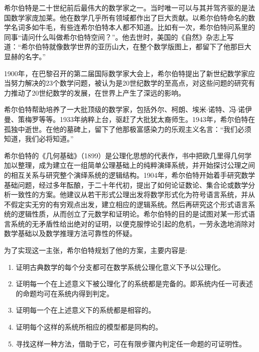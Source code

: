 \documentclass[b5paper]{ctexart}
\begin{document}
希尔伯特是二十世纪前后最伟大的数学家之一。当时唯一可以与其并驾齐驱的是法国数学家庞加莱。他在数学几乎所有领域都作出了巨大贡献。以希尔伯特命名的数学名词多如牛毛，有些连希尔伯特本人都不知道。比如有一次，希尔伯特问系里的同事“请问什么叫做希尔伯特空间？”。他去世时，美国的《自然》杂志上写道：“希尔伯特就像数学世界的亚历山大，在整个数学版图上，都留下了他那巨大显赫的名字。”\cite{HanXueTao16}

1900年，在巴黎召开的第二届国际数学家大会上，希尔伯特提出了新世纪数学家应当努力解决的23个数学问题，被认为是20世纪数学的至高点，对这些问题的研究有力推动了20世纪数学的发展，在世界上产生了深远的影响。

希尔伯特帮助培养了一大批顶级的数学家，包括外尔、柯朗、埃米$\cdot$诺特、冯$\cdot$诺伊曼、策梅罗等等。1933年纳粹上台，驱赶了大批犹太裔师生。1943年，希尔伯特在孤独中逝世。在他的墓碑上，留下了他那极富感染力的乐观主义名言：“我们必须知道，我们必将知道。”

希尔伯特的《几何基础》（1899）是公理化思想的代表作，书中把欧几里得几何学加以整理，成为建立在一组简单公理基础上的纯粹演绎系统，并开始探讨公理之间的相互关系与研究整个演绎系统的逻辑结构。1904年，希尔伯特开始着手研究数学基础问题，经过多年酝酿，于二十年代初，提出了如何论证数论、集合论或数学分析一致性的方案。他建议从若干形式公理出发将数学形式化为符号语言系统，并从不假定实无穷的有穷观点出发，建立相应的逻辑系统。然后再研究这个形式语言系统的逻辑性质，从而创立了元数学和证明论。希尔伯特的目的是试图对某一形式语言系统的无矛盾性给出绝对的证明，以便克服悖论引起的危机，一劳永逸地消除对数学基础以及数学推理方法可靠性的怀疑。

为了实现这一主张，希尔伯特规划了他的方案，主要内容是:
\begin{enumerate}
\item 证明古典数学的每个分支都可在数学系统公理化意义下予以公理化。
\item 证明每一个在上述意义下被公理化了的系统都是完备的。即系统内任一可表述的命题均可在系统内得到判定。
\item 证明每一个在上述意义下的系统都是相容的。
\item 证明每个这样的系统所相应的模型都是同构的。
\item 寻找这样一种方法，借助于它，可在有限步骤内判定任一命题的可证明性。
\end{enumerate}
\end{document}
